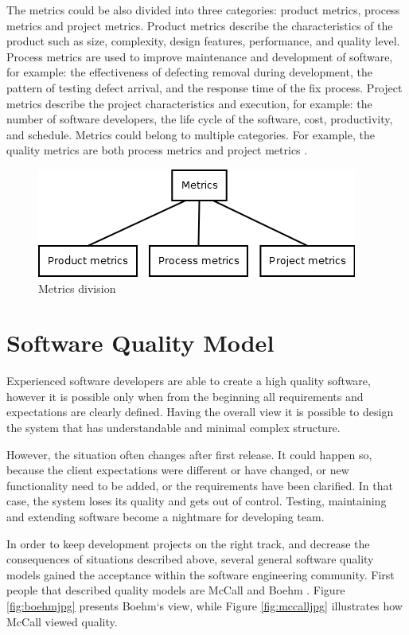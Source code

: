 The metrics could be also divided into three categories: product metrics, process metrics and project metrics. Product metrics describe the characteristics of the product such as size, complexity, design features, performance, and quality level. Process metrics are used to improve maintenance and development of software, for example: the effectiveness of defecting removal during development, the pattern of testing defect arrival, and the response time of the fix process. Project metrics describe the project characteristics and execution, for example: the number of software developers, the life cycle of the software, cost, productivity, and schedule. Metrics could belong to multiple categories. For example, the quality metrics are both process metrics and project metrics \cite{metrics}. 

\begin{figure}[h!]
	\centering
	\includegraphics[scale=0.5]{img/Diagram2.png} 
	\caption{Metrics division}		
	\label{fig:metrics2}
\end{figure}


\section{Software Quality Model}
Experienced software developers are able to create a high quality software, however it is possible only when from the beginning all requirements and expectations are clearly defined. Having the overall view it is possible to design the system that has understandable and minimal complex structure. 

However, the situation often changes after first release. It could happen so, because the client expectations were different or have changed, or new functionality need to be added, or the requirements have been clarified. In that case, the system loses its quality and gets out of control. Testing, maintaining and extending software become a nightmare for developing team. 

In order to keep development projects on the right track, and decrease the consequences of situations described above, several general software quality models gained the acceptance within the software engineering community. First people that described quality models are McCall and Boehm \cite{rigorous}. Figure \ref{fig:boehmjpg} presents Boehm`s view, while Figure \ref{fig:mccalljpg} illustrates how McCall viewed quality.

